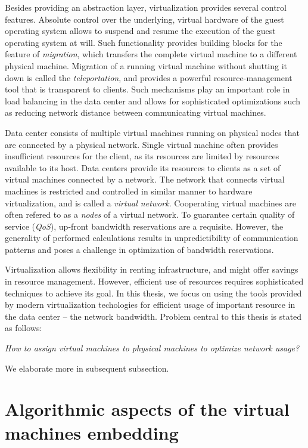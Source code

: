 Besides providing an abstraction layer, virtualization provides several control features.
Absolute control over the underlying, virtual hardware of the guest operating system allows to suspend and resume the execution of the guest operating system at will.
Such functionality provides building blocks for the feature of \emph{migration}, which transfers the complete virtual machine to a different physical machine.
Migration of a running virtual machine without shutting it down is called the \emph{teleportation}, and provides a powerful resource-management tool that is transparent to clients.
Such mechanisms play an important role in load balancing in the data center and allows for sophisticated optimizations such as reducing network distance between communicating virtual machines.

Data center consists of multiple virtual machines running on physical nodes
that are connected by a physical network. Single virtual machine often provides
insufficient resources for the client, as its resources are limited by resources
available to its host. Data centers provide its resources to clients as a set
of virtual machines connected by a network. The network that connects virtual
machines is restricted and controlled in similar manner to hardware
virtualization, and is called a \emph{virtual network}. Cooperating virtual
machines are often refered to as a \emph{nodes} of a virtual network. To
guarantee certain quality of service (\emph{QoS}), up-front bandwidth
reservations are a requisite. However, the generality of performed calculations
results in unpredictibility of communication patterns and poses a challenge in
optimization of bandwidth reservations.

Virtualization allows
flexibility in renting infrastructure, and might offer savings in resource
management. However, efficient use of resources requires sophisticated
techniques to achieve its goal. In this thesis, we focus on using the tools
provided by modern virtualization techologies for efficient usage of important
resource in the data center -- the network bandwidth. Problem central to this
thesis is stated as follows:

\begin{center}
  \emph{How to assign virtual machines to physical machines to optimize network
  usage?}
\end{center}

We elaborate more in subsequent subsection.

\section{Algorithmic aspects of the virtual machines embedding}

